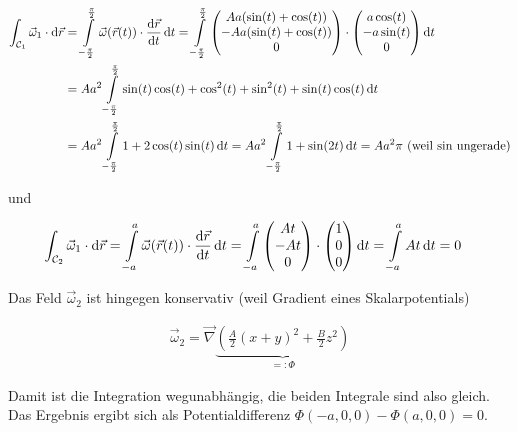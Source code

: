 \documentclass[a4paper,german,12pt,smallheadings]{scrartcl}
\begin{document}
\begin{align}
  \int_{\mathcal{C}_1} \vec{\omega}_1 \cdot \dif\vec{r}
  &= \int\limits_{-\frac{\pi}{2}}^{\frac{\pi}{2}} \vec{\omega}(\vec{r}(t)) \cdot \frac{\dif\vec{r}}{\dif t} \dif t
  = \int\limits_{-\frac{\pi}{2}}^{\frac{\pi}{2}} \begin{pmatrix} Aa(\sin(t) + \cos(t)) \\ -Aa(\sin(t) + \cos(t)) \\ 0 \end{pmatrix} \cdot \begin{pmatrix} a\cos(t) \\ -a\sin(t) \\ 0 \end{pmatrix} \dif t \\
  &= Aa^2 \int\limits_{-\frac{\pi}{2}}^{\frac{\pi}{2}} \sin(t)\cos(t) + \cos^2(t) + \sin^2(t) + \sin(t)\cos(t) \dif t \\
  &= Aa^2 \int\limits_{-\frac{\pi}{2}}^{\frac{\pi}{2}} 1 + 2\cos(t)\sin(t) \dif t
  = Aa^2 \int\limits_{-\frac{\pi}{2}}^{\frac{\pi}{2}} 1 + \sin(2t) \dif t
  = Aa^2 \pi \text{ (weil $\sin$ ungerade)}
\end{align}

und

\begin{align}
  \int_{\mathcal{C}_2} \vec{\omega}_1 \cdot \dif\vec{r}
  &= \int\limits_{-a}^{a} \vec{\omega}(\vec{r}(t)) \cdot \frac{\dif\vec{r}}{\dif t} \dif t
  = \int\limits_{-a}^{a} \begin{pmatrix} At \\ -At \\ 0  \end{pmatrix} \cdot \begin{pmatrix} 1 \\ 0 \\ 0\end{pmatrix} \dif t
  = \int\limits_{-a}^{a} At \dif t = 0
\end{align}

Das Feld $\vec{\omega}_2$ ist hingegen konservativ (weil Gradient eines Skalarpotentials)

\begin{align}
  \vec{\omega}_2 = \vec{\nabla} \underbrace{\left( \frac{A}{2} (x+y)^2 + \frac{B}{2} z^2 \right)}_{=: \Phi}
\end{align}

Damit ist die Integration wegunabhängig, die beiden Integrale sind also gleich.
Das Ergebnis ergibt sich als Potentialdifferenz $\Phi(-a, 0, 0) - \Phi(a, 0, 0)
= 0$.
\end{document}
